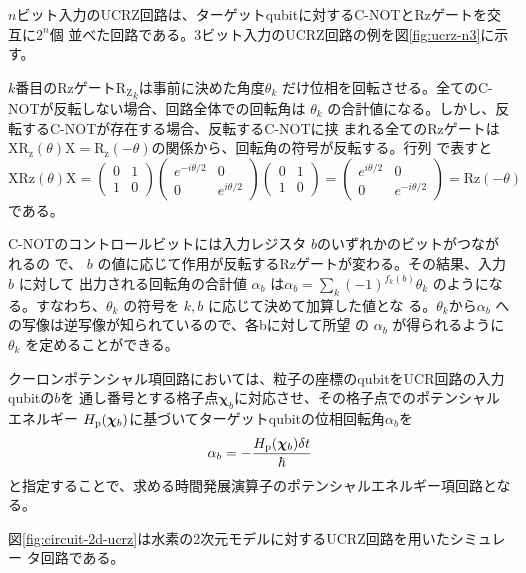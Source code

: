 \documentclass[fontsize=11pt]{jlreq}
\begin{document}
$n$ビット入力のUCRZ回路は、ターゲットqubitに対するC-NOTとRzゲートを交互に$2^n$個
並べた回路である。3ビット入力のUCRZ回路の例を図\ref{fig:ucrz-n3}に示す。

$k$番目のRzゲート$\mathrm{R_Z}_k$は事前に決めた角度$\theta_k$
だけ位相を回転させる。全てのC-NOTが反転しない場合、回路全体での回転角は
$\theta_k$ の合計値になる。しかし、反転するC-NOTが存在する場合、反転するC-NOTに挟
まれる全てのRzゲートは$\mathrm{XR_z}(\theta)\mathrm{X}=\mathrm{R_z}(-\theta)$の関係から、回転角の符号が反転する。行列
で表すと
\begin{equation}
    \mathrm{XRz}(\theta)\mathrm{X} = \begin{pmatrix}
        0 & 1 \\
        1 & 0
    \end{pmatrix}
    \begin{pmatrix}
        e^{-i\theta/2} & 0 \\
        0 & e^{i\theta/2}
    \end{pmatrix}
    \begin{pmatrix}
        0 & 1 \\
        1 & 0
    \end{pmatrix}
    = \begin{pmatrix}
        e^{i\theta/2} & 0 \\
        0 & e^{-i\theta/2}
    \end{pmatrix}
    = \mathrm{Rz}(-\theta)
\end{equation}
である。

C-NOTのコントロールビットには入力レジスタ $b$のいずれかのビットがつながれるの
で、 $b$ の値に応じて作用が反転するRzゲートが変わる。その結果、入力 $b$ に対して
出力される回転角の合計値 $\alpha_b$ は$\alpha_b=\sum_{k}{(-1)^{f_k(b)}\theta_k}$
のようになる。すなわち、$\theta_k$ の符号を $k,b$ に応じて決めて加算した値とな
る。$\theta_k$から$\alpha_b$ への写像は逆写像が知られているので、各bに対して所望
の $\alpha_b$ が得られるように$\theta_k$ を定めることができる。

クーロンポテンシャル項回路においては、粒子の座標のqubitをUCR回路の入力qubitの$b$を
通し番号とする格子点$\bm{\chi}_b$に対応させ、その格子点でのポテンシャルエネルギー
$H_{\mathrm{p}}(\bm{\chi}_b)$に基づいてターゲットqubitの位相回転角$\alpha_b$を
\begin{equation}
\alpha_b = -\frac{H_{\mathrm{p}}(\bm{\chi}_b)\delta t}{\hbar}
\end{equation}
と指定することで、求める時間発展演算子のポテンシャルエネルギー項回路となる。

図\ref{fig:circuit-2d-ucrz}は水素の2次元モデルに対するUCRZ回路を用いたシミュレー
タ回路である。
\end{document}

